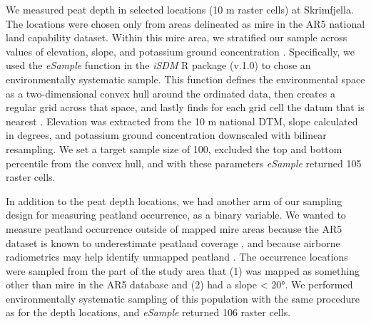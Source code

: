 \documentclass[soil, manuscript]{copernicus}
\begin{document}
We measured peat depth in selected locations (10 m raster cells) at Skrimfjella.
The locations were chosen only from areas delineated as mire in the AR5 national land capability dataset.
Within this mire area, we stratified our sample across values of elevation, slope, and potassium ground concentration \citep[from processed airborne gamma ray spectrometry,][]{baranwalHelicopterborneMagneticElectromagnetic2013}.
Specifically, we used the \emph{eSample} function in the \emph{iSDM} R package (v.1.0) to chose an environmentally systematic sample.
This function defines the environmental space as a two-dimensional convex hull around the ordinated data, then creates a regular grid across that space, and lastly finds for each grid cell the datum that is nearest \citep{hattabUnifiedFrameworkModel2017}.
Elevation was extracted from the 10 m national DTM, slope calculated in degrees, and potassium ground concentration downscaled with bilinear resampling.
We set a target sample size of 100, excluded the top and bottom percentile from the convex hull, and with these parameters \emph{eSample} returned 105 raster cells.

In addition to the peat depth locations, we had another arm of our sampling design for measuring peatland occurrence, as a binary variable.
We wanted to measure peatland occurrence outside of mapped mire areas because the AR5 dataset is known to underestimate peatland coverage \citep[especially in forests,][]{brynLandCoverNorway2018}, and because airborne radiometrics may help identify unmapped peatland \citep{gatisMappingUplandPeat2019, olearyDigitalSoilMapping2022}.
The occurrence locations were sampled from the part of the study area that (1) was mapped as something other than mire in the AR5 database and (2) had a slope \textless{} 20°.
We performed environmentally systematic sampling of this population with the same procedure as for the depth locations, and \emph{eSample} returned 106 raster cells.
\end{document}
